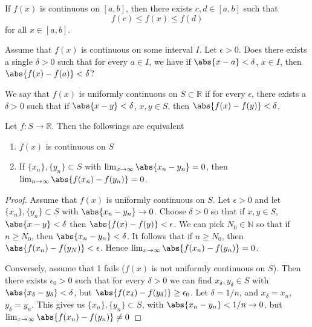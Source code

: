 
\begin{thm}
If $f(x)$ is continuous on $[a,b]$, then there exists $c,d\in [a,b]$ such that \[f(c)\leq f(x) \leq f(d)\] for all $x\in [a,b]$.    
\end{thm}


\begin{ques}
Assume that $f(x)$ is continuous on some interval $I$. Let $\epsilon > 0$. Does there exists a single $\delta > 0$ such that for every $a\in I$, we have if $\abs{x-a} < \delta$, $x\in I$, then $\abs{f(x)-f(a)}<\delta$?
\end{ques}

\begin{defn}
We say that $f(x)$ is uniformly continuous on $S\subset \mathbb{R}$ if for every $\epsilon$, there exists a $\delta > 0$ such that if $\abs{x-y} < \delta$, $x,y\in S$, then $\abs{f(x)-f(y)} < \delta$.
\end{defn}

\begin{thm}
Let $f\colon S\to \mathbb{R}$. Then the followings are equivalent
\begin{enumerate}
    \item $f(x)$ is continuous on $S$
    \item If $\{x_n\}, \{y_n\} \subset S$ with $\lim_{x\to\infty} \abs{x_n-y_n} = 0$, then $\lim_{n\to \infty} \abs{f(x_n)-f(y_n)} = 0$.
\end{enumerate}
\end{thm}

\begin{proof}
Assume that $f(x)$ is uniformly continuous on $S$. Let $\epsilon > 0$ and let $\{x_n\},\{y_n\}\subset S$ with $\abs{x_n-y_n}\to 0$. Choose $\delta > 0$ so that if $x,y\in S$, $\abs{x-y}<\delta$ then $\abs{f(x) - f(y)} < \epsilon$. We can pick $N_0 \in \mathbb{N}$ so that if $n\geq N_0$, then $\abs{x_n-y_n}<\delta$. It follows that if $n\geq N_0$, then $\abs{f(x_n)-f(y_N)} < \epsilon$. Hence $\lim_{x\to\infty} \abs{f(x_n)-f(y_n)} = 0$.

Conversely, assume that 1 fails ($f(x)$ is not uniformly continuous on $S$). Then there exists $\epsilon_0 > 0$ such that for every $\delta > 0$ we can find $x_\delta ,y_\delta \in S$ with $\abs{x_\delta -y_\delta }<\delta$, but $\abs{f(x_\delta)-f(y_\delta)}\geq \epsilon_0$. Let $\delta = 1/n$, and $x_\delta = x_n$, $y_\delta = y_n$. This gives us $\{x_n\},\{y_n\}\subset S$, with $\abs{x_n - y_n} < 1/n \to 0$, but $\lim_{x\to\infty} \abs{f(x_n)-f(y_n)} \neq 0$
\end{proof}

